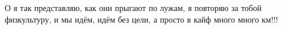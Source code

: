  
 
 
 
 

\qqSecCmt


О я так представляю, как они прыгают по лужам, я повторяю за тобой физкультуру,
и мы идём, идём без цели, а просто в кайф много много км!!!
